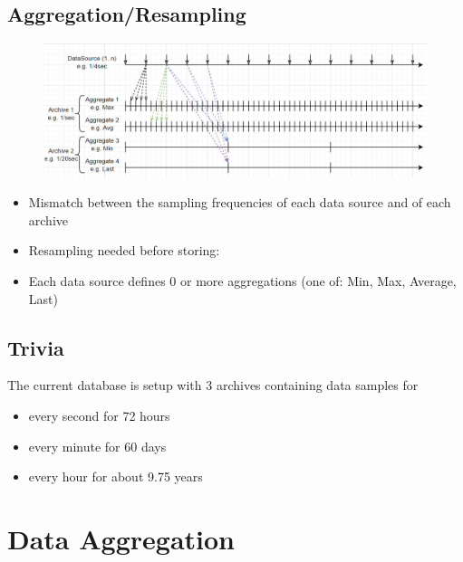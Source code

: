 \documentclass[t, 9pt, aspectratio=169]{beamer}
\begin{document}
    \subsection{Aggregation/Resampling}

    \begin{frame}{\secname}{\subsecname}
        \begin{figure}
            \includegraphics[scale=0.35]{rrdb-structure.jpg}
        \end{figure}
        \begin{itemize}
            \item Mismatch between the sampling frequencies of each data source and of each archive
            \item Resampling needed before storing: 
            \item Each data source defines 0 or more aggregations (one of: Min, Max, Average, Last)
        \end{itemize}
    \end{frame}

    \subsection{Trivia}

    \begin{frame}{\secname}{\subsecname}
        The current database is setup with 3 archives containing data samples for
        \begin{itemize}
            \item every second for 72 hours
            \item every minute for 60 days
            \item every hour for about 9.75 years\footnotemark
        \end{itemize}
    \end{frame}

    \section{Data Aggregation}
\end{document}
